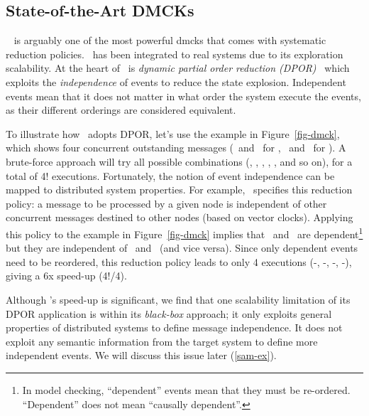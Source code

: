 


\subsection{State-of-the-Art DMCKs}
\label{mot-state}



\modist~\cite{Yang+09-Modist} is arguably one of the most powerful
dmcks that comes with systematic reduction policies.  \modist\ has been
integrated to real systems due to its exploration
scalability.  At the heart of \modist\ is {\em dynamic partial order
  reduction (DPOR)}~\cite{Flanagan+05-Dpor} which exploits the {\em
  independence} of events to reduce the state explosion.  Independent
events mean that it does not matter in what order the system execute
the events, as their different orderings are considered equivalent.

To illustrate how \modist\ adopts DPOR, let's use the example in
Figure~\ref{fig-dmck}, which shows four concurrent 
outstanding messages 
(\ma\ and \mb\ for \none, \mc\ and \md\ for \ntwo).  A brute-force
approach will try all possible combinations (, ,
, , , and so on), for a total of 4!
executions.
Fortunately, the notion of event independence can be mapped to
distributed system properties.  For example, \modist\ specifies this
reduction policy: a message to be processed by a given node is
independent of other concurrent messages destined to other nodes
(based on vector clocks).  Applying this policy to the example in
Figure~\ref{fig-dmck} implies that \ma\ and \mb\ are
dependent\footnote[1]{In model checking, ``dependent'' events mean
  that they must be re-ordered.  ``Dependent'' does not mean
  ``causally dependent''.}  but they are independent of \mc\ and
\md\ (and vice versa).  Since only dependent events need to be
reordered, this reduction policy leads to only 4 executions
(\ma\mb-\mc\md, \ma\mb-\md\mc, \mb\ma-\mc\md, \mb\ma-\md\mc), giving a
6x speed-up (4!/4).


Although \modist's speed-up is significant, we find that one
scalability limitation of its DPOR application is within its {\em
  black-box} approach; it only exploits general properties of
distributed systems to define message independence.  It does not
exploit any semantic information from the target system to define more
independent events.  We will discuss this issue later
(\sec\ref{sam-ex}).



